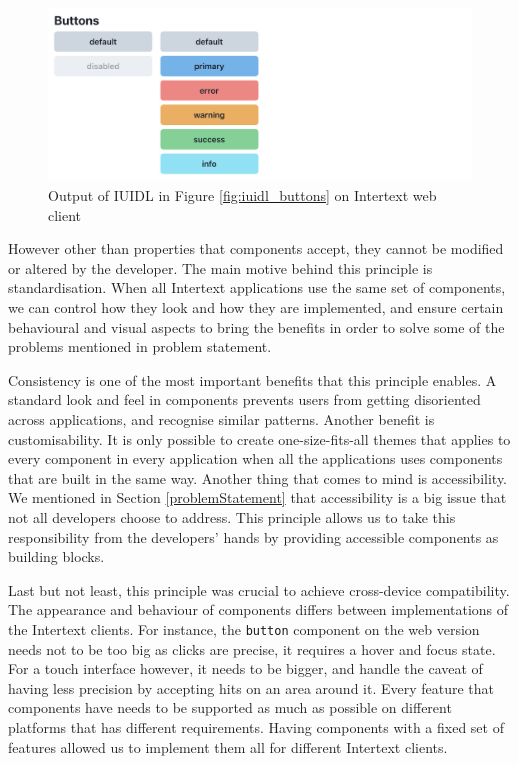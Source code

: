 \begin{figure}
  \centering
  \includegraphics[width=13cm]{thesis/paper/images/buttons.png}
  \caption{Output of IUIDL in Figure \ref{fig:iuidl_buttons} on Intertext web client}%
  \label{fig:iuidl_buttons_output}%
\end{figure}

However other than properties that components accept, they cannot be modified or altered by the developer. The main motive behind this principle is standardisation. When all Intertext applications use the same set of components, we can control how they look and how they are implemented, and ensure certain behavioural and visual aspects to bring the benefits in order to solve some of the problems mentioned in problem statement.

Consistency is one of the most important benefits that this principle enables. A standard look and feel in components prevents users from getting disoriented across applications, and recognise similar patterns. Another benefit is customisability. It is only possible to create one-size-fits-all themes that applies to every component in every application when all the applications uses components that are built in the same way. Another thing that comes to mind is accessibility. We mentioned in Section \ref{problemStatement} that accessibility is a big issue that not all developers choose to address. This principle allows us to take this responsibility from the developers' hands by providing accessible components as building blocks. 

Last but not least, this principle was crucial to achieve cross-device compatibility. The appearance and behaviour of components differs between implementations of the Intertext clients. For instance, the \texttt{button} component on the web version needs not to be too big as clicks are precise, it requires a hover and focus state. For a touch interface however, it needs to be bigger, and handle the caveat of having less precision by accepting hits on an area around it. Every feature that components have needs to be supported as much as possible on different platforms that has different requirements. Having components with a fixed set of features allowed us to implement them all for different Intertext clients.

